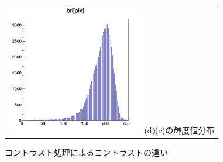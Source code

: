 \documentclass[12pt,a4paper]{jarticle}
\begin{document}
\begin{figure}[htbp]
\begin{tabular}{c}
        \begin{minipage}{0.5\hsize}
          \centering
              \includegraphics[clip, width=60mm]{cont_hist.png}
              \hspace{1.6cm} (d)(c)の輝度値分布
        \end{minipage}
    
      \end{tabular}
      \caption{コントラスト処理によるコントラストの違い\label{fig:do_contrust_beforeandafter}}
\end{figure}
\newpage
\end{document}
